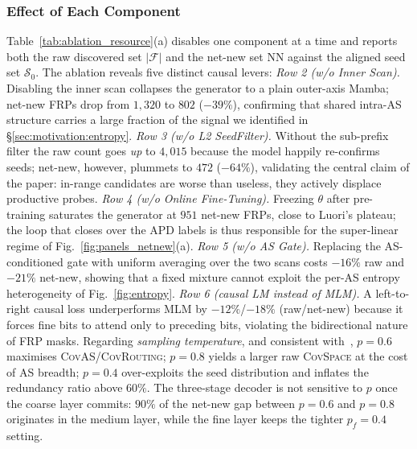\documentclass[conference]{IEEEtran}
\begin{document}
\subsubsection{Effect of Each Component}
Table~\ref{tab:ablation_resource}(a) disables one component at a time and
reports both the raw discovered set $|\mathcal{F}|$ and the
net-new set $\mathrm{NN}$ against the aligned seed set
$\mathcal{S}_{0}$.  The ablation reveals five distinct causal
levers:
\emph{Row 2 (w/o Inner Scan).}  Disabling the inner scan collapses
the generator to a plain outer-axis Mamba; net-new FRPs drop
from $1{,}320$ to $802$ ($-39\%$), confirming that shared
intra-AS structure carries a large fraction of the signal we
identified in \S\ref{sec:motivation:entropy}.
\emph{Row 3 (w/o L2 SeedFilter).}  Without the sub-prefix filter
the raw count goes \emph{up} to $4{,}015$ because the model
happily re-confirms seeds; net-new, however, plummets to $472$
($-64\%$), validating the central claim of the paper: in-range
candidates are worse than useless, they actively displace
productive probes.
\emph{Row 4 (w/o Online Fine-Tuning).}  Freezing $\theta$ after
pre-training saturates the generator at $951$ net-new FRPs, close
to Luori's plateau; the loop that closes over the APD labels is
thus responsible for the super-linear regime of
Fig.~\ref{fig:panels_netnew}(a).
\emph{Row 5 (w/o AS Gate).}  Replacing the AS-conditioned gate
with uniform averaging over the two scans costs $-16\%$ raw and
$-21\%$ net-new, showing that a fixed mixture cannot exploit
the per-AS entropy heterogeneity of Fig.~\ref{fig:entropy}.
\emph{Row 6 (causal LM instead of MLM).}  A left-to-right
causal loss underperforms MLM by $-12\%$/$-18\%$ (raw/net-new)
because it forces fine bits to attend only to preceding bits,
violating the bidirectional nature of FRP masks.
Regarding \emph{sampling temperature}, and consistent
with~\cite{wei2025gungnir}, $p{=}0.6$ maximises
\textsc{CovAS}/\textsc{CovRouting}; $p{=}0.8$ yields a larger
raw \textsc{CovSpace} at the cost of AS breadth; $p{=}0.4$
over-exploits the seed distribution and inflates the redundancy
ratio above $60\%$.  The three-stage decoder is not sensitive
to $p$ once the coarse layer commits: $90\%$ of the net-new gap
between $p{=}0.6$ and $p{=}0.8$ originates in the medium layer,
while the fine layer keeps the tighter $p_f{=}0.4$ setting.
\end{document}
